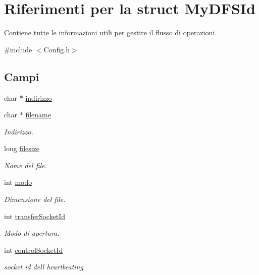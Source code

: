 \hypertarget{structMyDFSId}{}\section{Riferimenti per la struct My\+D\+F\+S\+Id}
\label{structMyDFSId}


Contiene tutte le informazioni utili per gestire il flusso di operazioni.  




{\ttfamily \#include $<$Config.\+h$>$}

\subsection*{Campi}
\begin{DoxyCompactItemize}
\item 
char $\ast$ \hyperlink{structMyDFSId_ac8c10a1a5b18776bf5e5585ee9e26331}{indirizzo}
\item 
char $\ast$ \hyperlink{structMyDFSId_ac0e1b8c96d859982c1a7d49f9e929e48}{filename}
\begin{DoxyCompactList}\small\item\em Indirizzo. \end{DoxyCompactList}\item 
long \hyperlink{structMyDFSId_a394540d568f1fa235d096fd790d2891f}{filesize}
\begin{DoxyCompactList}\small\item\em Nome del file. \end{DoxyCompactList}\item 
int \hyperlink{structMyDFSId_a98bc5ce1a7734459d8b81c997da4e9f0}{modo}
\begin{DoxyCompactList}\small\item\em Dimensione del file. \end{DoxyCompactList}\item 
int \hyperlink{structMyDFSId_a8d5f597502e29e2edc6d2f46c2323b1d}{transfer\+Socket\+Id}
\begin{DoxyCompactList}\small\item\em Modo di apertura. \end{DoxyCompactList}\item 
int \hyperlink{structMyDFSId_a4b67c0973fca25c75395e001b0bf8fc7}{control\+Socket\+Id}
\begin{DoxyCompactList}\small\item\em socket id dell\textquotesingle{} heartbeating \end{DoxyCompactList}\item 

\end{DoxyCompactItemize}
